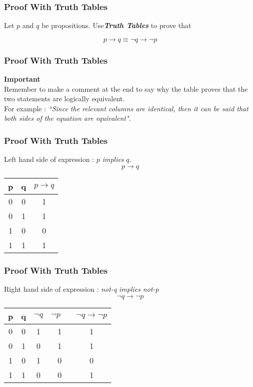 \documentclass{beamer}
\begin{document}
\begin{frame}

\frametitle{Proof With Truth Tables}
\Large
Let $p$ and $q$ be propositions. Use\textbf{\textit{Truth Tables}} to prove that

\[ p \rightarrow q \equiv \neg q \rightarrow \neg p\]
\end{frame}
\begin{frame}
\frametitle{Proof With Truth Tables}
\Large
\vspace{-1cm}
\textbf{Important}\\ 
Remember to make a comment at the end to say why the table proves that the two statements are logically equivalent. \\ For example : \emph{``Since the relevant columns are identical, then it can be said that both sides of the equation are equivalent"}.
\end{frame}
\begin{frame}
\frametitle{Proof With Truth Tables}
\Large
\vspace{-1cm}
Left hand side of expression : $p$ \textit{implies} $q$.
\[p \rightarrow q\]
\begin{center}
\begin{tabular}{|c|c||c|}
\hline  \phantom{spa}p\phantom{spa}&  \phantom{spa}q\phantom{spa}& \phantom{sp}$p \rightarrow q$ \phantom{sp} \\ 
\hline  0&  0&  1\\ 
\hline  0&  1&  1\\ 
\hline  1&  0&  0\\ 
\hline  1&  1&  1\\ 
\hline 
\end{tabular} 
\end{center}

\end{frame}
\begin{frame}

\frametitle{Proof With Truth Tables}
\Large
\vspace{-1cm}
Right hand side of expression : \textit{not-q} \textit{implies} \textit{not-p}
\[\neg q \rightarrow \neg p\]
\begin{center}
\begin{tabular}{|c|c||c|c|c|}
\hline  \phantom{sp}p\phantom{sp}&  \phantom{sp}q\phantom{sp}&\phantom{sp} $\neg q$ \phantom{sp} & \phantom{sp} $\neg p \phantom{sp}$ & $\neg q \rightarrow \neg p$ \\ 
\hline  0&  0& 1& 1& 1\\ 
\hline  0&  1& 0& 1& 1\\ 
\hline  1&  0& 1& 0& 0\\ 
\hline  1&  1& 0& 0& 1\\ 
\hline 
\end{tabular}
\end{center}
\end{frame}
\end{document}
